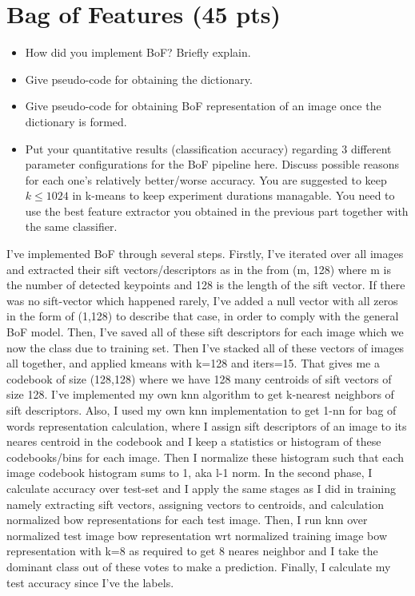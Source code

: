 \documentclass[12pt]{article}
\begin{document}
\section{Bag of Features (45 pts)}
    \begin{itemize}
        \item How did you implement BoF? Briefly explain.
        \item Give pseudo-code for obtaining the dictionary.
        \item Give pseudo-code for obtaining BoF representation of an image once the dictionary is formed. 
        \item Put your quantitative results (classification accuracy) regarding 3 different parameter configurations for the BoF pipeline here. Discuss possible reasons for each one's relatively better/worse accuracy. You are suggested to keep $k \leq 1024$ in k-means to keep experiment durations managable. You need to use the best feature extractor you obtained in the previous part together with the same classifier.
    \end{itemize}

    \begin{center}
        \raggedright
        I've implemented BoF through several steps. Firstly, I've iterated over all images and extracted their sift vectors/descriptors as in the from (m, 128) where m is the number of detected keypoints and 128 is the length of the sift vector.
        If there was no sift-vector which happened rarely, I've added a null vector with all zeros in the form of (1,128) to describe that case, in order to comply with the general BoF model.
        Then, I've saved all of these sift descriptors for each image which we now the class due to training set. Then I've stacked all of these vectors of images all together, and applied kmeans with k=128 and iters=15.
        That gives me a codebook of size (128,128) where we have 128 many centroids of sift vectors of size 128.
        I've implemented my own knn algorithm to get k-nearest neighbors of sift descriptors.
        Also, I used my own knn implementation to get 1-nn for bag of words representation calculation, where I assign sift descriptors of an image to its neares centroid in the codebook 
        and I keep a statistics or histogram of these codebooks/bins for each image.
        Then I normalize these histogram such that each image codebook histogram sums to 1, aka l-1 norm.
        In the second phase, I calculate accuracy over test-set and I apply the same stages as I did in training namely
        extracting sift vectors, assigning vectors to centroids, and calculation normalized bow representations for each test image.
        Then, I run knn over normalized test image bow representation wrt normalized training image bow representation with k=8 as required to get 8 neares neighbor 
        and I take the dominant class out of these votes to make a prediction. Finally, I calculate my test accuracy since I've the labels.
        \\~\\
        

    \end{center}
    
\end{document}
